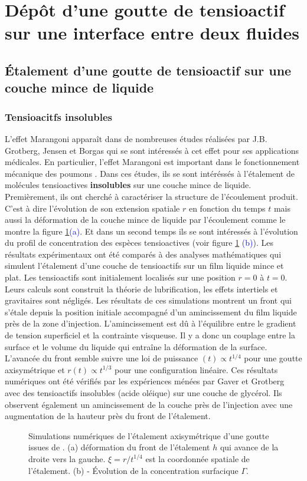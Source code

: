 \section{Dépôt d'une goutte de tensioactif sur une interface entre deux fluides}

\subsection{Étalement d'une goutte de tensioactif sur une couche mince de liquide}

\subsubsection{Tensioacitfs insolubles}
L'effet Marangoni apparaît dans de nombreuses études réalisées par J.B. Grotberg, Jensen et Borgas qui se sont intéressés à cet effet pour ses applications médicales. En particulier, l'effet Marangoni est important  dans le fonctionnement mécanique des poumons \cite{Grotberg1994}. Dans ces études, ils se sont intéréssés à l'étalement de molécules tensioactives \textbf{insolubles} sur une couche mince de liquide. Premièrement, ils ont cherché à caractériser la structure de l'écoulement produit. C'est à dire l'évolution de son extension spatiale $r$ en fonction du temps $t$ mais aussi la déformation de la couche mince de liquide par l'écoulement comme le montre la figure \ref{fig:Grotberg}\textcolor{blue}{(a)}. Et dans un second temps ils se sont intéressés à l'évolution du profil de concentration des espèces tensioactives (voir figure \ref{fig:Grotberg} \textcolor{blue}{(b)}). Les résultats expérimentaux ont été comparés à des analyses mathématiques qui simulent l'étalement d'une couche de tensioactifs sur un film liquide mince et plat. Les tensioactifs sont initialement localisés sur une position $r=0$ à $t=0$. Leurs calculs sont construit la théorie de lubrification, les effets intertiels et gravitaires sont négligés. Les résultats de ces simulations montrent un front qui s'étale depuis la position initiale accompagné d'un amincissement du film liquide près de la zone d'injection. L'amincissement est dû à l'équilibre entre le gradient de tension superficiel et la contrainte visqueuse. Il y a donc un couplage entre la surface et le volume du liquide qui entraîne la déformation de la surface. L'avancée du front semble suivre une loi de puissance $(t)\propto t^{1/4}$ pour une goutte axisymétrique et $r(t)\propto t^{1/3}$ pour une configuration linéaire. Ces résultats numériques ont été vérifiés par les expériences ménées par Gaver et Grotberg \cite{Gaver1992} avec des tensioactifs insolubles (acide oléique) sur une couche de glycérol. Ils observent également un amincissement de la couche près de l'injection avec une augmentation de la hauteur près du front de l'étalement.
\begin{figure}[!ht]
  \centering
  
  \caption{Simulations numériques de l'étalement axisymétrique d'une goutte issues de \cite{Jensen1992}. (a) déformation du front de l'étalement $h$ qui avance de la droite vers la gauche. $\xi=r/t^{1/4}$ est la coordonnée spatiale de l'étalement. (b) - Évolution de la concentration surfacique $\Gamma$.}
  \label{fig:Grotberg}
\end{figure}
